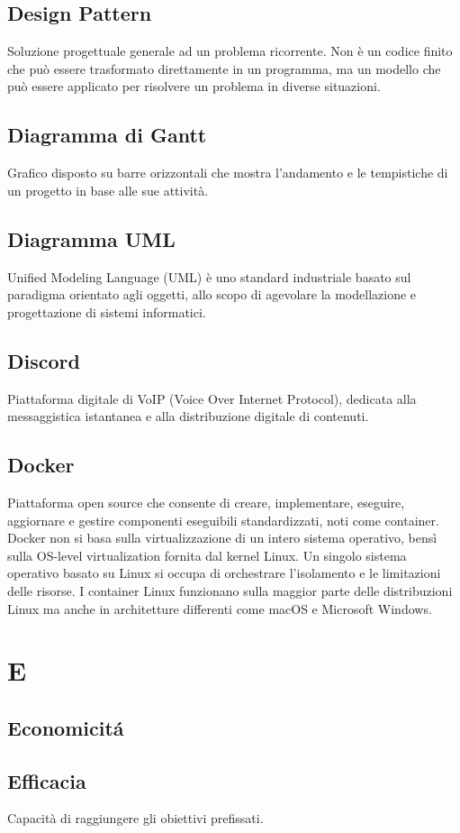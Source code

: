 \documentclass[12pt]{article}
\begin{document}
		\subsection{Design Pattern}
		Soluzione progettuale generale ad un problema ricorrente. Non è un codice finito che può essere trasformato direttamente in un programma, ma un modello che può essere applicato per risolvere un problema in diverse situazioni.
		\subsection{Diagramma di Gantt}
		Grafico disposto su barre orizzontali che mostra l'andamento e le tempistiche di un progetto in base alle sue attività.
		\subsection{Diagramma UML}
		Unified Modeling Language (UML) è uno standard industriale basato sul paradigma orientato agli oggetti, allo scopo di agevolare la modellazione e progettazione di sistemi informatici.
		\subsection{Discord}
		Piattaforma digitale di VoIP (Voice Over Internet Protocol), dedicata alla messaggistica istantanea e alla distribuzione digitale di contenuti.
		\subsection{Docker}
		Piattaforma open source che consente di creare, implementare, eseguire, aggiornare e gestire componenti eseguibili standardizzati, noti come container. Docker non si basa sulla virtualizzazione di un intero sistema operativo, bensì sulla OS-level virtualization fornita dal kernel Linux. Un singolo sistema operativo basato su Linux si occupa di orchestrare l'isolamento e le limitazioni delle risorse. I container Linux funzionano sulla maggior parte delle distribuzioni Linux ma anche in architetture differenti come macOS e Microsoft Windows.

	\clearpage
	\section{E}
		\subsection{Economicit\'a}
		\subsection{Efficacia}
		Capacità di raggiungere gli obiettivi prefissati.
\end{document}
